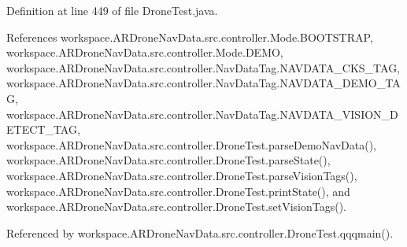 Definition at line 449 of file Drone\+Test.\+java.



References workspace.\+A\+R\+Drone\+Nav\+Data.\+src.\+controller.\+Mode.\+B\+O\+O\+T\+S\+T\+R\+A\+P, workspace.\+A\+R\+Drone\+Nav\+Data.\+src.\+controller.\+Mode.\+D\+E\+M\+O, workspace.\+A\+R\+Drone\+Nav\+Data.\+src.\+controller.\+Nav\+Data\+Tag.\+N\+A\+V\+D\+A\+T\+A\+\_\+\+C\+K\+S\+\_\+\+T\+A\+G, workspace.\+A\+R\+Drone\+Nav\+Data.\+src.\+controller.\+Nav\+Data\+Tag.\+N\+A\+V\+D\+A\+T\+A\+\_\+\+D\+E\+M\+O\+\_\+\+T\+A\+G, workspace.\+A\+R\+Drone\+Nav\+Data.\+src.\+controller.\+Nav\+Data\+Tag.\+N\+A\+V\+D\+A\+T\+A\+\_\+\+V\+I\+S\+I\+O\+N\+\_\+\+D\+E\+T\+E\+C\+T\+\_\+\+T\+A\+G, workspace.\+A\+R\+Drone\+Nav\+Data.\+src.\+controller.\+Drone\+Test.\+parse\+Demo\+Nav\+Data(), workspace.\+A\+R\+Drone\+Nav\+Data.\+src.\+controller.\+Drone\+Test.\+parse\+State(), workspace.\+A\+R\+Drone\+Nav\+Data.\+src.\+controller.\+Drone\+Test.\+parse\+Vision\+Tags(), workspace.\+A\+R\+Drone\+Nav\+Data.\+src.\+controller.\+Drone\+Test.\+print\+State(), and workspace.\+A\+R\+Drone\+Nav\+Data.\+src.\+controller.\+Drone\+Test.\+set\+Vision\+Tags().



Referenced by workspace.\+A\+R\+Drone\+Nav\+Data.\+src.\+controller.\+Drone\+Test.\+qqqmain().


